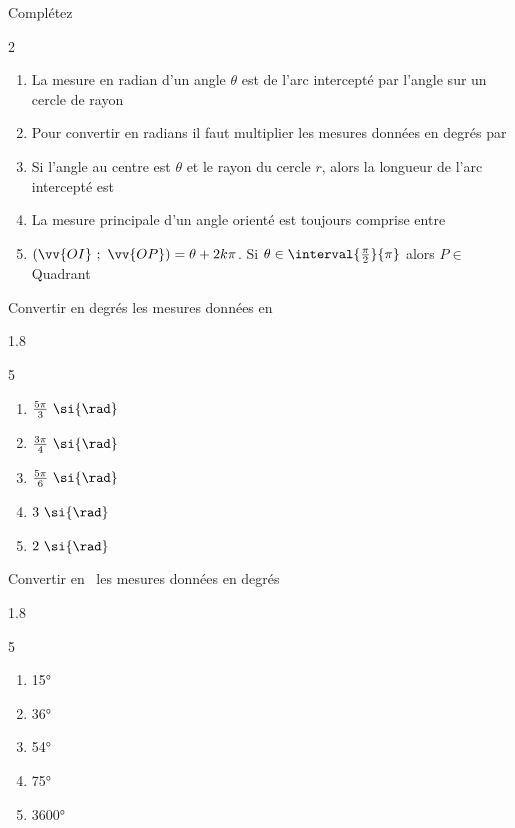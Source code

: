\documentclass[main.tex]{subfiles}
\begin{document}
\begin{exercise}[concepts] Complétez
	\begin{spacing}{2}
		\begin{enumerate}[label={},leftmargin=*]
			\item La mesure en radian d'un angle $\theta$ est \dotfill de l'arc intercepté par l'angle sur un cercle de rayon \dotfill
			\item Pour convertir en radians il faut multiplier les mesures données en degrés par \dotfill 
			\item Si l'angle au centre est $\theta$ et le rayon du cercle $r$, alors la longueur de l'arc intercepté est \dotfill 
			\item La mesure principale d'un angle orienté est toujours comprise entre \dotfill 
			\item   $(\vv{OI}~;~\vv{OP})=\theta+2k\pi$. Si $\theta\in\interval{\tfrac{\pi}{2}}{\pi}$ alors $P\in$ Quadrant \dotfill 
		\end{enumerate}
	\end{spacing} \vspace{-1em}
\end{exercise}  
\begin{exercise} Convertir en degrés les mesures données en~\si{\rad} 
	\vspace{-1em}
	\begin{spacing}{1.8}
		\begin{multicols}{5} 
			\begin{enumerate}[label={$\theta_{\arabic*}=$},leftmargin=*]
				\item  $\tfrac{5\pi}{3}~\si{\rad}$
				\item $\tfrac{3\pi}{4}~\si{\rad}$
				\item $\tfrac{5\pi}{6}~\si{\rad}$
				\item $3~\si{\rad}$
				\item $2~\si{\rad}$
			\end{enumerate}
		\end{multicols}\vspace{-2.5em}
	\end{spacing}
\end{exercise}
\begin{exercise} Convertir en~\si{\rad}  les mesures données en degrés
	\vspace{-1em}
\begin{spacing}{1.8}
	\begin{multicols}{5} 
		\begin{enumerate}[label={$\theta_{\arabic*}=$},leftmargin=*]
			\item  \ang{15}
			\item  \ang{36}
			\item  \ang{54}
			\item  \ang{75}
			\item  \ang{3600}
		\end{enumerate}
	\end{multicols}\vspace{-2.5em}
\end{spacing}
\end{exercise}
\end{document}
